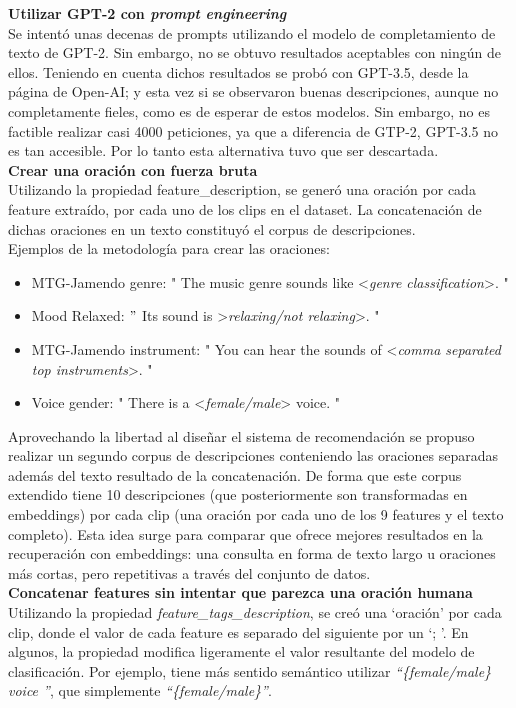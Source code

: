 \textbf{Utilizar GPT-2 con \textit{prompt engineering}}\\
Se intentó unas decenas de prompts utilizando el modelo de completamiento de texto de GPT-2. Sin embargo, no se obtuvo resultados aceptables con ningún de ellos. Teniendo en cuenta dichos resultados se probó con GPT-3.5, desde la página de Open-AI; y esta vez si se observaron buenas descripciones, aunque no completamente fieles, como es de esperar de estos modelos. Sin embargo, no es factible realizar casi 4000 peticiones, ya que a diferencia de GTP-2, GPT-3.5 no es tan accesible. Por lo tanto esta alternativa tuvo que ser descartada.\\

\textbf{Crear una oración con fuerza bruta}\\
Utilizando la propiedad feature\_description, se generó una oración por cada feature extraído, por cada uno de los clips en el dataset. La concatenación de dichas oraciones en un texto constituyó el corpus de descripciones. \\
Ejemplos de la metodología para crear las oraciones:
\begin{itemize}
    \item MTG-Jamendo genre: " The music genre sounds like <\textit{genre classification}>. "
    \item Mood Relaxed: $"$ Its sound is >\textit{relaxing/not relaxing}>. "
    \item MTG-Jamendo instrument: " You can hear the sounds of <\textit{comma separated top instruments}>. "
    \item Voice gender: " There is a <\textit{female/male}> voice. "
\end{itemize}
Aprovechando la libertad al diseñar el sistema de recomendación se propuso realizar un segundo corpus de descripciones conteniendo las oraciones separadas además del texto resultado de la concatenación. De forma que este corpus extendido tiene 10 descripciones (que posteriormente son transformadas en embeddings) por cada clip (una oración por cada uno de los 9 features y el texto completo). Esta idea surge para comparar que ofrece mejores resultados en la recuperación con embeddings: una consulta en forma de texto largo u oraciones más cortas, pero repetitivas a través del conjunto de datos.\\

\textbf{Concatenar features sin intentar que parezca una oración humana}\\
Utilizando la propiedad \textit{feature\_tags\_description}, se creó una `oración' por cada clip, donde el valor de cada feature es separado del siguiente por un `; '. En algunos, la propiedad modifica ligeramente el valor resultante del modelo de clasificación. Por ejemplo, tiene más sentido semántico utilizar \textit{``\{female/male\} voice ''}, que simplemente \textit{``\{female/male\}''}.\\

